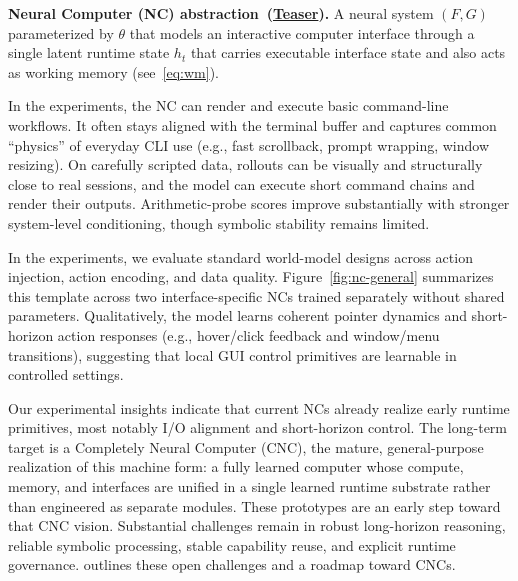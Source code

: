 \begin{tcolorbox}[
  colback=apricotglaze!40!white,
  colframe=metablue!40,
  interior style={shade,shading angle=315,left color=white,right color=apricotglaze!55!white},
  boxrule=0pt,
  borderline west={1pt}{0pt}{gray!60},
  left=6pt,right=4pt,top=3pt,bottom=3pt]
\small
\textbf{Neural Computer (NC) abstraction~(\hyperlink{teaser}{Teaser}).}
A neural system $(F, G)$ parameterized by $\theta$ that models an interactive computer interface through a single latent runtime state $h_t$ that carries executable interface state and also acts as working memory (see~\cref{eq:wm}).
\end{tcolorbox}

In the \nccligen{} experiments, the NC can render and execute basic command-line workflows.
It often stays aligned with the terminal buffer and captures common ``physics'' of everyday CLI use (e.g., fast scrollback, prompt wrapping, window resizing).
On carefully scripted data, rollouts can be visually and structurally close to real sessions, and the model can execute short command chains and render their outputs.
Arithmetic-probe scores improve substantially with stronger system-level conditioning, though symbolic stability remains limited.

In the \ncguiworld{} experiments, we evaluate standard world-model designs across action injection, action encoding, and data quality.
Figure~\ref{fig:nc-general} summarizes this template across two interface-specific NCs trained separately without shared parameters.
Qualitatively, the model learns coherent pointer dynamics and short-horizon action responses (e.g., hover/click feedback and window/menu transitions), suggesting that local GUI control primitives are learnable in controlled settings.

Our experimental insights indicate that current NCs already realize early runtime primitives, most notably I/O alignment and short-horizon control.
The long-term target is a Completely Neural Computer (CNC), the mature, general-purpose realization of this machine form: a fully learned computer whose compute, memory, and interfaces are unified in a single learned runtime substrate rather than engineered as separate modules.
These prototypes are an early step toward that CNC vision. 
Substantial challenges remain in robust long-horizon reasoning, reliable symbolic processing, stable capability reuse, and explicit runtime governance.
 outlines these open challenges and a roadmap toward CNCs. 

